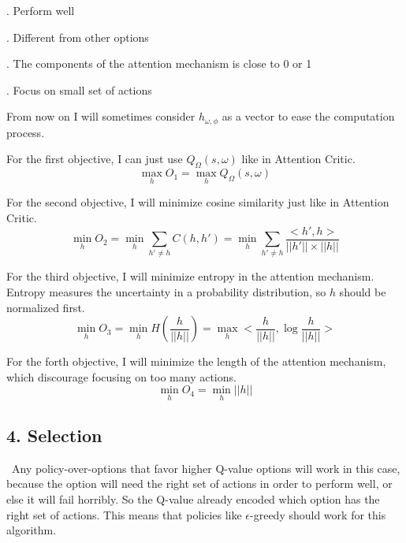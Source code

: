 \documentclass{article}
\begin{document}
	. Perform well
	
	. Different from other options
	
	. The components of the attention mechanism is close to 0 or 1
	
	. Focus on small set of actions
	
	\quad From now on I will sometimes consider $h_{\omega,\phi}$ as a vector to ease the computation process.
	
	\quad For the first objective, I can just use $Q_\Omega(s,\omega)$ like in Attention Critic. $$\max_h O_1=\max_h Q_\Omega(s,\omega)$$
	
	\quad For the second objective, I will minimize cosine similarity just like in Attention Critic.$$\min_h O_2 = \min_h \sum_{h' \neq h} C(h, h') = \min_h \sum_{h' \neq h} \frac{<h', h>}{||h'||\times||h||}$$
	
	\quad For the third objective, I will minimize entropy in the attention mechanism. Entropy measures the uncertainty in a probability distribution, so $h$ should be normalized first. $$\min_h O_3 = \min_h H(\frac{h}{||h||}) =\max_h <\frac{h}{||h||},\log \frac{h}{||h||}>$$
	
	\quad For the forth objective, I will minimize the length of the attention mechanism, which discourage focusing on too many actions. $$\min_h O_4 = \min_h ||h||$$
	
	\subsection*{4. Selection}
	\qquad \ Any policy-over-options that favor higher Q-value options will work in this case, because the option will need the right set of actions in order to perform well, or else it will fail horribly. So the Q-value already encoded which option has the right set of actions. This means that policies like $\epsilon$-greedy should work for this algorithm.
	
\end{document}
